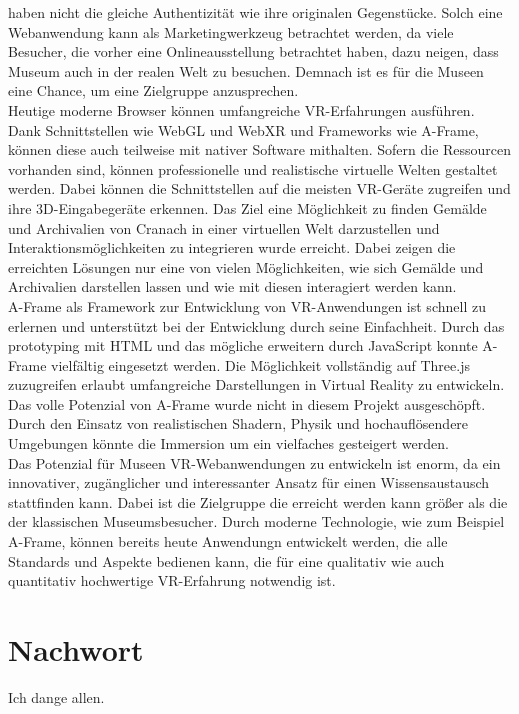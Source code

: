 \documentclass[a4paper,12pt,oneside]{article}
\begin{document}
    haben nicht die gleiche Authentizität wie ihre originalen Gegenstücke.
    Solch eine Webanwendung kann als Marketingwerkzeug betrachtet
    werden, da viele Besucher, die vorher eine Onlineausstellung
    betrachtet haben, dazu neigen, dass Museum auch in der realen
    Welt zu besuchen. Demnach ist es für die Museen eine Chance, um
    eine Zielgruppe anzusprechen. \\
    Heutige moderne Browser können umfangreiche VR-Erfahrungen ausführen.
    Dank Schnittstellen
    wie WebGL und WebXR und Frameworks wie A-Frame, können diese auch
    teilweise mit nativer Software mithalten. Sofern die Ressourcen
    vorhanden sind, können professionelle und realistische virtuelle
    Welten gestaltet werden. Dabei können die Schnittstellen auf
    die meisten VR-Geräte zugreifen und ihre 3D-Eingabegeräte erkennen.
    Das Ziel eine Möglichkeit zu finden Gemälde und Archivalien von Cranach
    in einer virtuellen Welt darzustellen und Interaktionsmöglichkeiten
    zu integrieren wurde erreicht. Dabei zeigen die erreichten Lösungen
    nur eine von vielen Möglichkeiten, wie sich Gemälde und Archivalien
    darstellen lassen und wie mit diesen interagiert werden kann. \\
    A-Frame als Framework zur Entwicklung von VR-Anwendungen ist schnell zu
    erlernen und unterstützt bei der Entwicklung durch seine Einfachheit.
    Durch das prototyping mit HTML und das mögliche erweitern durch 
    JavaScript konnte A-Frame vielfältig eingesetzt werden. Die Möglichkeit
    vollständig auf Three.js zuzugreifen erlaubt umfangreiche 
    Darstellungen in Virtual Reality zu entwickeln. Das volle Potenzial
    von A-Frame wurde nicht in diesem Projekt ausgeschöpft. Durch den Einsatz
    von realistischen Shadern, Physik und hochauflösendere Umgebungen könnte
    die Immersion um ein vielfaches gesteigert werden. \\
    Das Potenzial für Museen VR-Webanwendungen zu entwickeln ist enorm,
    da ein innovativer, zugänglicher und interessanter Ansatz für 
    einen Wissensaustausch stattfinden kann. Dabei ist die Zielgruppe
    die erreicht werden kann größer als die der klassischen 
    Museumsbesucher. Durch moderne Technologie, wie zum Beispiel A-Frame,
    können bereits heute Anwendungn entwickelt werden, die alle
    Standards und Aspekte bedienen kann, die für eine qualitativ
    wie auch quantitativ hochwertige VR-Erfahrung notwendig ist.
  \section{Nachwort}
    Ich dange allen.
\end{document}
